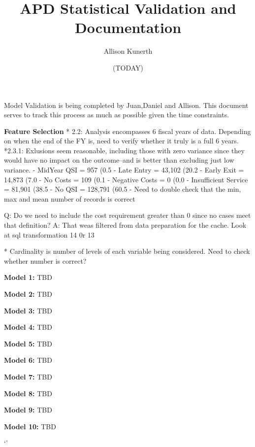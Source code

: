 \documentclass[12pt, letterpaper]{article}
\title{APD Statistical Validation and Documentation}
\author{Allison Kunerth}
\date{(TODAY)}
\begin{document}
\maketitle

Model Validation is being completed by Juan,Daniel and Allison. This document serves to track this process as much as possible given the time constraints.

\textbf{Feature Selection} 
* 2.2: Analysis encompasses 6 fiscal years of data. Depending on when the end of the FY is, need to verify whether it truly is a full 6 years.
*2.3.1: Exlusions seem reasonable, including those with zero variance since they would have no impact on the outcome--and is better than excluding just low variance. 
    - MidYear QSI = 957 (0.5%
    - Late Entry = 43,102 (20.2%
    - Early Exit = 14,873 (7.0%
    - No Costs = 109 (0.1%
    - Negative Costs = 0 (0.0%
    - Insufficient Service = 81,901 (38.5%
    - No QSI = 128,791 (60.5%
- Need to double check that the min, max and mean number of records is correct


Q: Do we need to include the cost requirement greater than 0 since no cases meet that definition?
A: That weas filtered from data preparation for the cache. Look at sql transformation 14 0r 13

* Cardinality is number of levels of each variable being considered. Need to check whether number is correct?


\textbf{Model 1:} 
TBD


\textbf{Model 2:}
TBD


\textbf{Model 3:}
TBD


\textbf {Model 4:} 
TBD


\textbf{Model 5:} 
TBD


\textbf{Model 6:} 
TBD


\textbf{Model 7:}
TBD


\textbf{Model 8:} 
TBD


\textbf{Model 9:} 
TBD


\textbf{Model 10:} 
TBD

    `'
\end{document}
